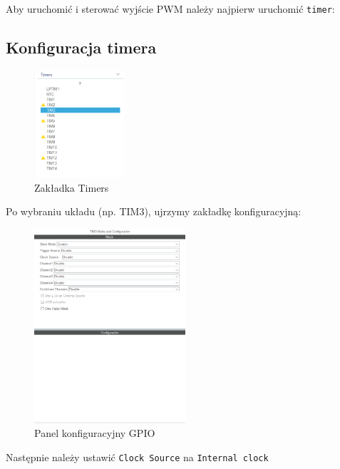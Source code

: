 \documentclass[11pt, a4paper]{article}
\begin{document}
Aby uruchomić i sterować wyjście PWM należy najpierw uruchomić \texttt{timer}:

\subsection*{Konfiguracja timera}

\begin{figure}[h!]
    \centering
    \includegraphics[width=0.3\textwidth]{IMAGES/tim.png}
    \caption{Zakładka Timers}
\end{figure}

Po wybraniu układu (np. TIM3), ujrzymy zakładkę konfiguracyjną: 
\begin{figure}[h!]
    \centering
    \includegraphics[width=0.5\textwidth]{IMAGES/tim_empty.png}
    \caption{Panel konfiguracyjny GPIO}
\end{figure}

\newpage

Następnie należy ustawić \texttt{Clock Source} na \texttt{Internal clock}
\end{document}
